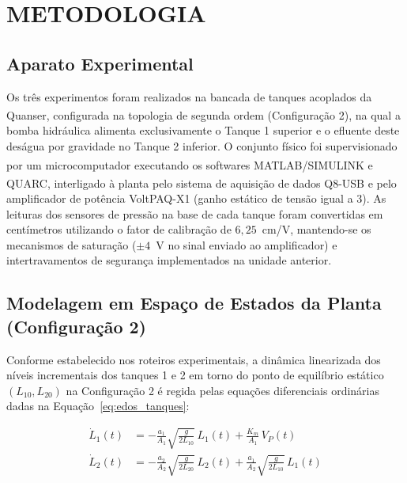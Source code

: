 \documentclass[a4paper,12pt]{article}
\begin{document}
\newpage


\thispagestyle{main}

\section{METODOLOGIA}

\subsection{Aparato Experimental}

\begin{justify}
    \hspace{4ex}Os três experimentos foram realizados na bancada de tanques acoplados da Quanser\textsuperscript{\textregistered}, configurada na topologia de segunda ordem (Configuração 2), na qual a bomba hidráulica alimenta exclusivamente o Tanque 1 superior e o efluente deste deságua por gravidade no Tanque 2 inferior. O conjunto físico foi supervisionado por um microcomputador executando os softwares MATLAB\textsuperscript{\textregistered}/SIMULINK\textsuperscript{\textregistered} e QUARC\textsuperscript{\textregistered}, interligado à planta pelo sistema de aquisição de dados Q8-USB e pelo amplificador de potência VoltPAQ-X1 (ganho estático de tensão igual a 3). As leituras dos sensores de pressão na base de cada tanque foram convertidas em centímetros utilizando o fator de calibração de $6{,}25$~cm/V, mantendo-se os mecanismos de saturação ($\pm 4$~V no sinal enviado ao amplificador) e intertravamentos de segurança implementados na unidade anterior.
\end{justify}

\subsection{Modelagem em Espaço de Estados da Planta (Configuração 2)}

\begin{justify}
    \hspace{4ex}Conforme estabelecido nos roteiros experimentais, a dinâmica linearizada dos níveis incrementais dos tanques 1 e 2 em torno do ponto de equilíbrio estático $(L_{10}, L_{20})$ na Configuração 2 é regida pelas equações diferenciais ordinárias dadas na Equação~\eqref{eq:edos_tanques}:
\end{justify}

\begin{equation}
    \begin{aligned}
        \dot{L}_1(t) &= -\frac{a_1}{A_1}\sqrt{\frac{g}{2 L_{10}}}\, L_1(t) + \frac{K_m}{A_1}\, V_P(t) \\
        \dot{L}_2(t) &= -\frac{a_2}{A_2}\sqrt{\frac{g}{2 L_{20}}}\, L_2(t) + \frac{a_1}{A_2}\sqrt{\frac{g}{2 L_{10}}}\, L_1(t)
    \end{aligned}
    \label{eq:edos_tanques}
\end{equation}
\end{document}
